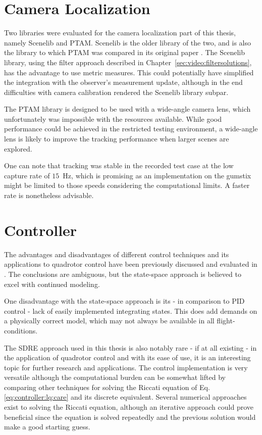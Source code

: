     \section{Camera Localization}
    \label{sec:discussion:cameralocalization}
        Two libraries were evaluated for the camera localization part of this thesis,
        namely Scenelib and PTAM. Scenelib is the older library of the two,
        and is also the library to which PTAM was compared in its original paper \citep{klein07parallel}.
        The Scenelib library, using the filter approach described in Chapter~\ref{sec:video:filtersolutions},
        has the advantage to use metric measures.
        This could potentially have simplified the integration with the
        observer's measurement update, although in the end difficulties
        with camera calibration rendered the Scenelib library subpar.

        The PTAM library is designed to be used with a wide-angle camera lens,
        which unfortunately was impossible with the resources available.
        While good performance could be achieved in the restricted testing
        environment, a wide-angle lens is likely to improve the tracking
        performance when larger scenes are explored.

        One can note that tracking was stable in the recorded test case
        at the low capture rate of $15$~Hz, which is promising as an implementation
        on the gumstix might be limited to those speeds considering the
        computational limits. A faster rate is nonetheless advisable.

    \section{Controller}
        The advantages and disadvantages of different control techniques
        and its applications to quadrotor control
        have been previously discussed and evaluated in \citep{bouabdallah04pid}.
        The conclusions are ambiguous, but the state-space approach is believed to
        excel with continued modeling.

        One disadvantage with the state-space approach is its - in comparison
        to PID control - lack of easily implemented integrating states.
        This does add demands on a physically correct model, which may
        not always be available in all flight-conditions.

        The SDRE approach used in this thesis is also notably rare - if at
        all existing - in the application of quadrotor control
        and with its ease of use, it is an interesting topic for further research and applications.
        The control implementation is very versatile although the computational
        burden can be somewhat lifted by comparing other techniques for solving
        the Riccati equation of Eq. \ref{eq:controller:lq:care} and its discrete equivalent.
        Several numerical approaches exist to solving the Riccati equation,
        although an iterative approach could prove beneficial since
        the equation is solved repeatedly and the previous solution would make a
        good starting guess.

